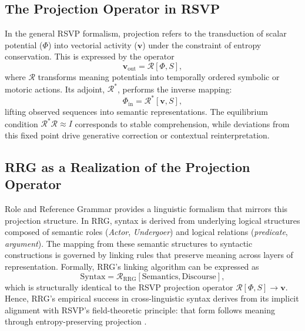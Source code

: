 \documentclass[11pt]{article}
\begin{document}
\subsection{The Projection Operator in RSVP}
In the general RSVP formalism, projection refers to the transduction of scalar potential ($\Phi$) into vectorial activity ($\mathbf{v}$) under the constraint of entropy conservation. This is expressed by the operator
\begin{equation}
\mathbf{v}_{\mathrm{out}} = \mathcal{R}[\Phi, S],
\end{equation}
where $\mathcal{R}$ transforms meaning potentials into temporally ordered symbolic or motoric actions. Its adjoint, $\mathcal{R}^{\ast}$, performs the inverse mapping:
\begin{equation}
\Phi_{\mathrm{in}} = \mathcal{R}^{\ast}[\mathbf{v}, S],
\end{equation}
lifting observed sequences into semantic representations. The equilibrium condition $\mathcal{R}^{\ast}\mathcal{R} \!\approx\! I$ corresponds to stable comprehension, while deviations from this fixed point drive generative correction or contextual reinterpretation.

\subsection{RRG as a Realization of the Projection Operator}
Role and Reference Grammar provides a linguistic formalism that mirrors this projection structure. In RRG, syntax is derived from underlying logical structures composed of semantic roles (\textit{Actor}, \textit{Undergoer}) and logical relations (\textit{predicate}, \textit{argument}). The mapping from these semantic structures to syntactic constructions is governed by linking rules that preserve meaning across layers of representation. Formally, RRG’s linking algorithm can be expressed as
\[
\text{Syntax} = \mathcal{R}_{\mathrm{RRG}}[\text{Semantics}, \text{Discourse}],
\]
which is structurally identical to the RSVP projection operator $\mathcal{R}[\Phi,S] \!\to\! \mathbf{v}$. Hence, RRG’s empirical success in cross-linguistic syntax derives from its implicit alignment with RSVP’s field-theoretic principle: that form follows meaning through entropy-preserving projection \citep{vanvalin2005exploring}.
\end{document}
